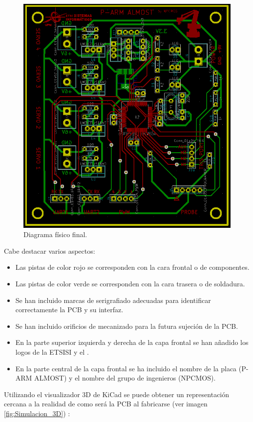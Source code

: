 \begin{figure}[H]
\centering
\includegraphics[width=0.9\linewidth]{pictures/PCB_FINAL_FIXED.PNG}
\caption{Diagrama físico final.}
\label{fig:Fisico_Final}
\end{figure}

Cabe destacar varios aspectos:
\begin{itemize}
    \item Las pistas de color rojo se corresponden con la cara frontal o de componentes.
    \item Las pistas de color verde se corresponden con la cara trasera o de soldadura.
    \item Se han incluido marcas de serigrafiado adecuadas para identificar correctamente la \ac{PCB} y su interfaz.
    \item Se han incluido orificios de mecanizado para la futura sujeción de la \ac{PCB}.
    \item En la parte superior izquierda y derecha de la capa frontal se han añadido los logos de la ETSISI y el \pArm{}.
    \item En la parte central de la capa frontal se ha incluido el nombre de la placa (P-ARM ALMOST) y el nombre del grupo de ingenieros (NPCMOS).
\end{itemize}

Utilizando el visualizador 3D de KiCad se puede obtener un representación cercana a la realidad de como será la \ac{PCB} al fabricarse (ver imagen \ref{fig:Simulacion_3D}) :

